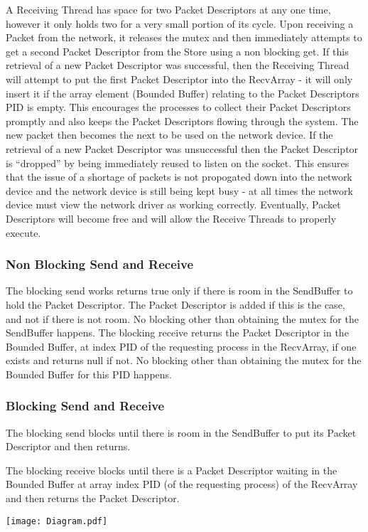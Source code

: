 \documentclass{article}
\begin{document}
A Receiving Thread has space for two Packet Descriptors at any
one time, however it only holds two for a very small portion of its
cycle. Upon receiving a Packet from the network, it releases the mutex
and then immediately attempts to get a second Packet Descriptor from
the Store using a non blocking get. If this retrieval of a new Packet
Descriptor was
successful, then the Receiving Thread will attempt to put the first
Packet Descriptor into the RecvArray - it will only insert it if the
array element (Bounded Buffer) relating to the Packet Descriptors PID
is empty. This encourages the processes to collect their Packet
Descriptors promptly and also keeps the Packet Descriptors flowing
through the system. The new packet then becomes the next to be used on
the network device. If the retrieval of a new Packet Descriptor was
unsuccessful then the Packet Descriptor is ``dropped'' by being
immediately reused to listen on the socket. This ensures that the
issue of a shortage of packets is not propogated down into the network
device and the network device is still being kept busy - at all times
the network device must view the network driver as working
correctly. Eventually, Packet Descriptors will become free and will
allow the Receive Threads to properly execute.

\subsubsection*{Non Blocking Send and Receive}
The blocking send works returns true only if there is room in the
SendBuffer to hold the Packet Descriptor. The Packet Descriptor is
added if this is the case, and not if there is not room. No blocking
other than obtaining the mutex for the SendBuffer happens.
The blocking receive returns the Packet Descriptor in the Bounded
Buffer, at index PID of the requesting process in the RecvArray, if
one exists and returns null if not. No blocking other than obtaining
the mutex for the Bounded Buffer for this PID happens.

\subsubsection*{Blocking Send and Receive}
The blocking send blocks until there is room in the SendBuffer to put
its Packet Descriptor and then returns.

The blocking receive blocks until there is a Packet Descriptor waiting
in the Bounded Buffer at array index PID (of the requesting process) of
the RecvArray and then returns the Packet Descriptor.

\texttt{[image: Diagram.pdf]}
\end{document}
